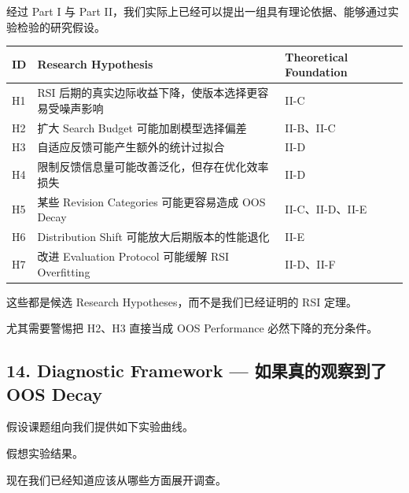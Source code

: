经过 Part I 与 Part II，我们实际上已经可以提出一组具有理论依据、能够通过实验检验的研究假设。

\begin{readertable}
\begin{longtable}[]{@{}
  >{\raggedright\arraybackslash}p{}
  >{\raggedright\arraybackslash}p{}
  >{\raggedright\arraybackslash}p{}@{}}
\toprule
ID & Research Hypothesis & Theoretical Foundation \\
\midrule
\endhead
H1 & RSI 后期的真实边际收益下降，使版本选择更容易受噪声影响 & II-C \\
H2 & 扩大 Search Budget 可能加剧模型选择偏差 & II-B、II-C \\
H3 & 自适应反馈可能产生额外的统计过拟合 & II-D \\
H4 & 限制反馈信息量可能改善泛化，但存在优化效率损失 & II-D \\
H5 & 某些 Revision Categories 可能更容易造成 OOS Decay & II-C、II-D、II-E \\
H6 & Distribution Shift 可能放大后期版本的性能退化 & II-E \\
H7 & 改进 Evaluation Protocol 可能缓解 RSI Overfitting & II-D、II-F \\
\bottomrule
\end{longtable}
\end{readertable}

这些都是候选 Research Hypotheses，而不是我们已经证明的 RSI 定理。

尤其需要警惕把 H2、H3 直接当成 OOS Performance 必然下降的充分条件。

\hypertarget{part-2-27-0001-diagnostic-framework-ux5982ux679cux771fux7684ux89c2ux5bdfux5230ux4e86-oos-decay}{%
\subsection{14. Diagnostic Framework --- 如果真的观察到了 OOS Decay}\label{part-2-27-0001-diagnostic-framework-ux5982ux679cux771fux7684ux89c2ux5bdfux5230ux4e86-oos-decay}}

假设课题组向我们提供如下实验曲线。


假想实验结果。

现在我们已经知道应该从哪些方面展开调查。

